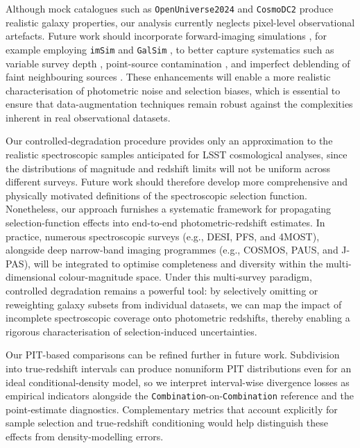 Although mock catalogues such as \texttt{OpenUniverse2024} and \texttt{CosmoDC2} produce realistic galaxy properties, our analysis currently neglects pixel-level observational artefacts. Future work should incorporate forward-imaging simulations \citep{2023MNRAS.522.2801T}, for example employing \texttt{imSim} \citep{2014SPIE.9150E..14C} and \texttt{GalSim} \citep{2015A&C....10..121R}, to better capture systematics such as variable survey depth \citep{2016ApJS..226...24L, 2021A&A...648A..98J, 2025A&A...694A.259Y}, point-source contamination \citep{2015MNRAS.454.3500K}, and imperfect deblending of faint neighbouring sources \citep{2025arXiv250316680L}. These enhancements will enable a more realistic characterisation of photometric noise and selection biases, which is essential to ensure that data-augmentation techniques remain robust against the complexities inherent in real observational datasets.  

Our controlled‐degradation procedure provides only an approximation to the realistic spectroscopic samples anticipated for LSST cosmological analyses, since the distributions of magnitude and redshift limits will not be uniform across different surveys. Future work should therefore develop more comprehensive and physically motivated definitions of the spectroscopic selection function. Nonetheless, our approach furnishes a systematic framework for propagating selection-function effects into end-to-end photometric-redshift estimates. In practice, numerous spectroscopic surveys (e.g., DESI, PFS, and 4MOST), alongside deep narrow-band imaging programmes (e.g., COSMOS, PAUS, and J-PAS), will be integrated to optimise completeness and diversity within the multi-dimensional colour-magnitude space. Under this multi‐survey paradigm, controlled degradation remains a powerful tool: by selectively omitting or reweighting galaxy subsets from individual datasets, we can map the impact of incomplete spectroscopic coverage onto photometric redshifts, thereby enabling a rigorous characterisation of selection‐induced uncertainties.

Our PIT-based comparisons can be refined further in future work. Subdivision into true-redshift intervals can produce nonuniform PIT distributions even for an ideal conditional-density model, so we interpret interval-wise divergence losses as empirical indicators alongside the \texttt{Combination}-on-\texttt{Combination} reference and the point-estimate diagnostics. Complementary metrics that account explicitly for sample selection and true-redshift conditioning would help distinguish these effects from density-modelling errors.

